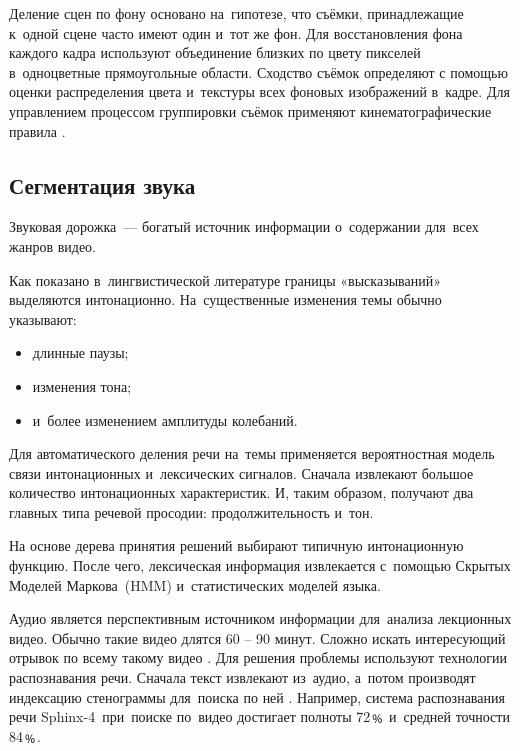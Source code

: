 Деление сцен по фону основано на~гипотезе, что съёмки,
принадлежащие к~одной сцене часто имеют один и~тот же фон.
Для восстановления фона каждого кадра используют объединение
близких по цвету пикселей в~одноцветные прямоугольные области.
Сходство съёмок определяют с помощью оценки распределения
цвета и~текстуры всех фоновых изображений в~кадре.
Для управлением процессом группировки съёмок
применяют кинематографические правила \cite{Chen:2008}.

\subsection{Сегментация звука}

Звуковая дорожка~— богатый источник информации
о~содержании для~всех жанров видео.

Как показано в~лингвистической литературе границы «высказываний»
выделяются интонационно.
На~существенные изменения темы обычно указывают:
\begin{itemize}
    \item длинные паузы;
    \item изменения тона;
    \item и~более изменением амплитуды колебаний.
\end{itemize}

Для автоматического деления речи на~темы
применяется вероятностная модель связи интонационных
и~лексических сигналов.
Сначала извлекают большое количество интонационных характеристик.
И, таким образом, получают два главных типа речевой просодии:
продолжительность и~тон.

На основе дерева принятия решений выбирают
типичную интонационную функцию.
После чего, лексическая информация извлекается
с~помощью Скрытых Моделей Маркова\
(HMM) и~статистических моделей языка.

Аудио является перспективным источником информации
для~анализа лекционных видео.
Обычно такие видео длятся 60 – 90 минут.
Сложно искать интересующий отрывок по всему такому видео \cite{Repp:2008}.
Для решения проблемы используют технологии
распознавания речи.
Сначала текст извлекают из~аудио,
а~потом производят индексацию стенограммы для~поиска по ней \cite{Kumar:2011}.
Например, система распознавания речи Sphinx-4\index{Sphinx-4}\ при~поиске
по~видео достигает полноты 72﹪ и~средней точности 84﹪.

